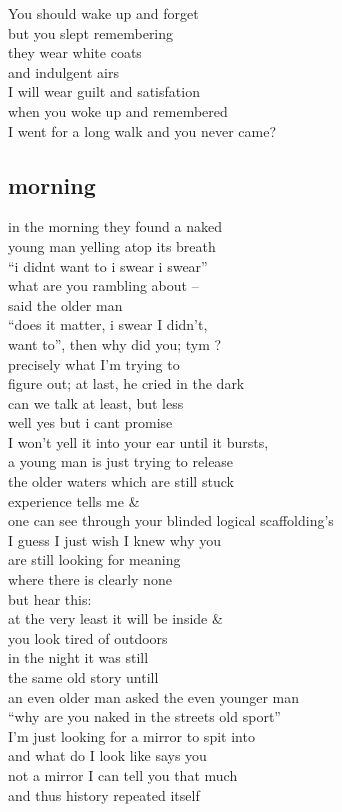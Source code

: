 \documentclass{article}
\begin{document}
You  should wake up and forget\\
but you slept remembering\\
they wear white coats\\
and indulgent airs\\
I will wear guilt and satisfation\\
when you woke up and remembered\\
I went for a long walk and you never came?
\clearpage

\subsection{morning}

in the morning they found a naked \\
young man yelling atop its breath\\
``i didnt want to i swear i swear'' \\
what are you rambling about --\\
said the older man\\
``does it matter, i swear I didn't,\\
want to'', then why did you; tym ?\\
precisely what I'm trying to \\
figure out; at last, he cried in the dark\\

can we talk at least, but less\\
well yes but i cant promise\\
I won't yell it into your ear until it bursts,\\
a young man is just trying to release\\
the older waters which are still stuck\\
experience tells me \&\\
one can see through your blinded logical scaffolding's\\
I guess I just wish I knew why you\\
are still looking for meaning\\
where there is clearly none\\
but hear this: \\
at the very least it will be inside \& \\



you look tired of outdoors\\
in the night it was still \\
the same old story untill\\
an even older man asked the even younger man \\
``why are you naked in the streets old sport''\\
I'm just looking for a mirror to spit into\\
and what do I look like says you \\
not a mirror I can tell you that much\\
and thus history repeated itself\\
\end{document}
